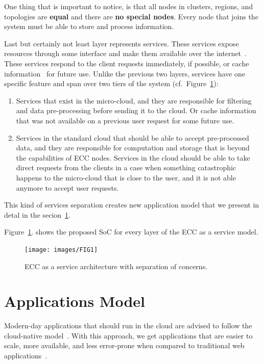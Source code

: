\noindent
One thing that is important to notice, is that all nodes in clusters, regions, and topologies are \textbf{equal} and there are \textbf{no special nodes}. Every node that joins the system must be able to store and process information.

Last but certainly not least layer represents services. These services expose resources through some interface and make them available over the internet~\cite{JinCJL14}. These services respond to the client requests immediately, if possible, or cache information~\cite{SatyanarayananBCD09,YaoXWYZP20} for future use. Unlike the previous two layers, services have one specific feature and span over two tiers of the system (cf.~Figure~\ref{fig:fig10}):

\begin{enumerate}[start=1,label={(\bfseries \roman*)}]\label{services}
	\item Services that exist in the micro-cloud, and they are responsible for filtering and data pre-processing before sending it to the cloud. Or cache information that was not available on a previous user request for some future use.
	\item Services in the standard cloud that should be able to accept pre-processed data, and they are responsible for computation and storage that is beyond the capabilities of ECC nodes. Services in the cloud should be able to take direct requests from the clients in a case when something catastrophic happens to the micro-cloud that is close to the user, and it is not able anymore to accept user requests.
\end{enumerate}

\noindent
This kind of services separation creates new application model that we present in detal in the secion~\ref{sec:application_model}. 

Figure~\ref{fig:fig10}. shows the proposed SoC for every layer of the ECC as a service model.

\begin{figure}[H]
	\texttt{[image: images/FIG1]}
	\vspace{-0.7cm}
	\caption{ECC as a service architecture with separation of concerns.}
	\label{fig:fig10}
\end{figure}
%
%
\section{Applications Model}\label{sec:application_model}
%
Modern-day applications that should run in the cloud are advised to follow the cloud-native model~\cite{GannonBS17}. With this approach, we get applications that are easier to scale, more available, and less error-prone when compared to traditional web applications~\cite{GannonBS17}. 


